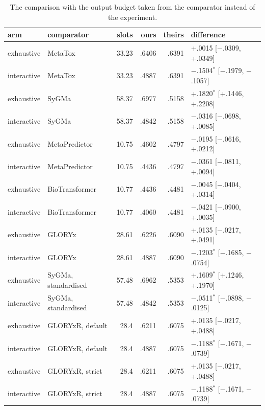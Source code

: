 \begin{table}[t]
\centering\small
\begin{threeparttable}
\caption{The comparison with the output budget taken from the comparator instead of the experiment.}
\label{tab:si-matched-comparison}
\begin{tabular}{llrrrl}
\toprule
arm & comparator & slots & ours & theirs & difference \\
\midrule
exhaustive & MetaTox & 33.23 & .6406 & .6391 & +.0015 [$-$.0309, +.0349] \\
interactive & MetaTox & 33.23 & .4887 & .6391 & $-$.1504$^{*}$ [$-$.1979, $-$.1057] \\
exhaustive & SyGMa & 58.37 & .6977 & .5158 & +.1820$^{*}$ [+.1446, +.2208] \\
interactive & SyGMa & 58.37 & .4842 & .5158 & $-$.0316 [$-$.0698, +.0085] \\
exhaustive & MetaPredictor & 10.75 & .4602 & .4797 & $-$.0195 [$-$.0616, +.0212] \\
interactive & MetaPredictor & 10.75 & .4436 & .4797 & $-$.0361 [$-$.0811, +.0094] \\
exhaustive & BioTransformer & 10.77 & .4436 & .4481 & $-$.0045 [$-$.0404, +.0314] \\
interactive & BioTransformer & 10.77 & .4060 & .4481 & $-$.0421 [$-$.0900, +.0035] \\
exhaustive & GLORYx & 28.61 & .6226 & .6090 & +.0135 [$-$.0217, +.0491] \\
interactive & GLORYx & 28.61 & .4887 & .6090 & $-$.1203$^{*}$ [$-$.1685, $-$.0754] \\
exhaustive & SyGMa, standardised & 57.48 & .6962 & .5353 & +.1609$^{*}$ [+.1246, +.1970] \\
interactive & SyGMa, standardised & 57.48 & .4842 & .5353 & $-$.0511$^{*}$ [$-$.0898, $-$.0125] \\
exhaustive & GLORYxR, default & 28.4 & .6211 & .6075 & +.0135 [$-$.0217, +.0488] \\
interactive & GLORYxR, default & 28.4 & .4887 & .6075 & $-$.1188$^{*}$ [$-$.1671, $-$.0739] \\
exhaustive & GLORYxR, strict & 28.4 & .6211 & .6075 & +.0135 [$-$.0217, +.0488] \\
interactive & GLORYxR, strict & 28.4 & .4887 & .6075 & $-$.1188$^{*}$ [$-$.1671, $-$.0739] \\
\bottomrule
\end{tabular}
\begin{tablenotes}[flushleft]\footnotesize

\end{tablenotes}
\end{threeparttable}
\end{table}
